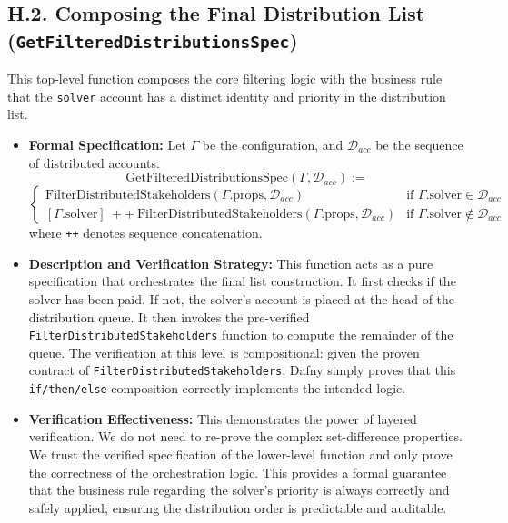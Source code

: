 \documentclass[
  english,
  onecolumn]{article}
\begin{document}
\subsection{\texorpdfstring{H.2. Composing the Final Distribution List
(\texttt{GetFilteredDistributionsSpec})}{H.2. Composing the Final Distribution List (GetFilteredDistributionsSpec)}}\label{h.2.-composing-the-final-distribution-list-getfiltereddistributionsspec}

This top-level function composes the core filtering logic with the
business rule that the \texttt{solver} account has a distinct identity
and priority in the distribution list.

\begin{itemize}
\item
  \textbf{Formal Specification:} Let \(\Gamma\) be the configuration,
  and \(\mathcal{D}_{acc}\) be the sequence of distributed accounts. \[
  \text{GetFilteredDistributionsSpec}(\Gamma, \mathcal{D}_{acc}) :=
  \] \[
  \begin{cases}
  \text{FilterDistributedStakeholders}(\Gamma.\text{props}, \mathcal{D}_{acc}) & \text{if } \Gamma.\text{solver} \in \mathcal{D}_{acc} \\
  [\Gamma.\text{solver}] \ ++ \ \text{FilterDistributedStakeholders}(\Gamma.\text{props}, \mathcal{D}_{acc}) & \text{if } \Gamma.\text{solver} \notin \mathcal{D}_{acc}
  \end{cases}
  \] where \texttt{++} denotes sequence concatenation.
\item
  \textbf{Description and Verification Strategy:} This function acts as
  a pure specification that orchestrates the final list construction. It
  first checks if the solver has been paid. If not, the solver's account
  is placed at the head of the distribution queue. It then invokes the
  pre-verified \texttt{FilterDistributedStakeholders} function to
  compute the remainder of the queue. The verification at this level is
  compositional: given the proven contract of
  \texttt{FilterDistributedStakeholders}, Dafny simply proves that this
  \texttt{if/then/else} composition correctly implements the intended
  logic.
\item
  \textbf{Verification Effectiveness:} This demonstrates the power of
  layered verification. We do not need to re-prove the complex
  set-difference properties. We trust the verified specification of the
  lower-level function and only prove the correctness of the
  orchestration logic. This provides a formal guarantee that the
  business rule regarding the solver's priority is always correctly and
  safely applied, ensuring the distribution order is predictable and
  auditable.
\end{itemize}
\end{document}
